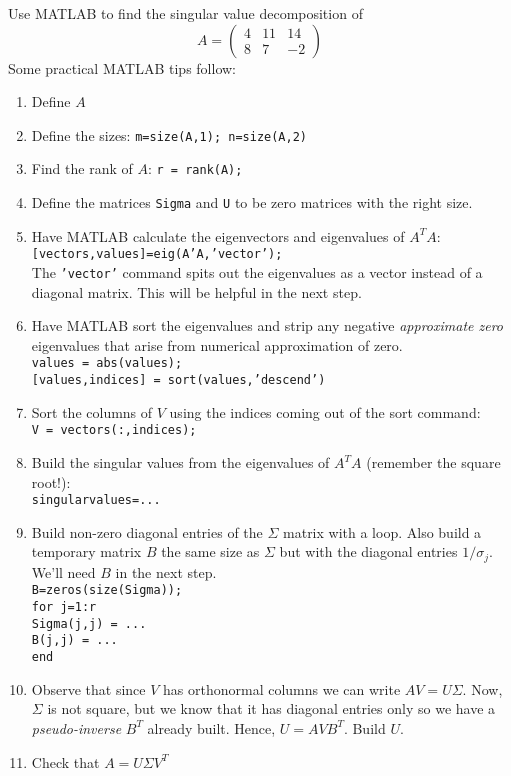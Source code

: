 \begin{problem}
    Use MATLAB to find the singular value decomposition of 
    \[ A = \begin{pmatrix} 4 & 11 & 14 \\ 8 & 7 & -2 \end{pmatrix} \]
    Some practical MATLAB tips follow:
    \begin{enumerate}
        \item Define $A$
        \item Define the sizes: \texttt{m=size(A,1); n=size(A,2)}
        \item Find the rank of $A$: \texttt{r = rank(A);}
        \item Define the matrices \texttt{Sigma} and \texttt{U} to be zero matrices with
            the right size.
        \item Have MATLAB calculate the eigenvectors and eigenvalues of $A^T A$:\\
            \texttt{[vectors,values]=eig(A'A,'vector');}\\
            The \texttt{'vector'} command spits out the eigenvalues as a vector instead of
            a diagonal matrix.  This will be helpful in the next step.
        \item Have MATLAB sort the eigenvalues and strip any negative {\it approximate
            zero} eigenvalues that arise from numerical approximation of zero. \\
            \texttt{values = abs(values);}\\
            \texttt{[values,indices] = sort(values,'descend')}
        \item Sort the columns of $V$ using the indices coming out of the sort command: \\
            \texttt{V = vectors(:,indices);}
        \item Build the singular values from the eigenvalues of $A^TA$ (remember the
            square root!):\\ \texttt{singularvalues=...}
        \item Build non-zero diagonal entries of the $\Sigma$ matrix with a loop.  Also build a
            temporary matrix $B$ the same size as $\Sigma$ but with the diagonal entries
            $1/\sigma_j$.  We'll need $B$ in the next step. \\
            \texttt{B=zeros(size(Sigma));}\\
            \texttt{for j=1:r}\\
            \texttt{Sigma(j,j) = ...}\\
            \texttt{B(j,j) = ...}\\
            \texttt{end}
        \item Observe that since $V$ has orthonormal columns we can write $AV = U \Sigma$.
            Now, $\Sigma$ is not square, but we know that it has diagonal entries only so
            we have a {\it pseudo-inverse} $B^T$ already built.  Hence, $U = A V B^T$.
            Build $U$.
        \item Check that $A = U \Sigma V^T$
    \end{enumerate}
\end{problem}

